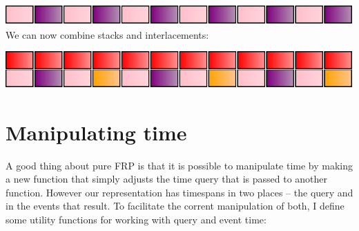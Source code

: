 \includegraphics{../figures/fig2.pdf}\\

We can now combine stacks and interlacements:

\begin{Shaded}
\begin{Highlighting}[]
\OtherTok{=}\NormalTok{ stack [atom }\NormalTok{,}
\NormalTok{              interlace [atom }\NormalTok{, interlace [atom }\NormalTok{]]}
\NormalTok{             ]}
\end{Highlighting}
\end{Shaded}

\includegraphics{../figures/fig3.pdf}\\

\section{Manipulating time}\label{manipulating-time}

A good thing about pure FRP is that it is possible to manipulate time by
making a new function that simply adjusts the time query that is passed
to another function. However our representation has timespans in two
places -- the query and in the events that result. To facilitate the
corrent manipulation of both, I define some utility functions for
working with query and event time:

